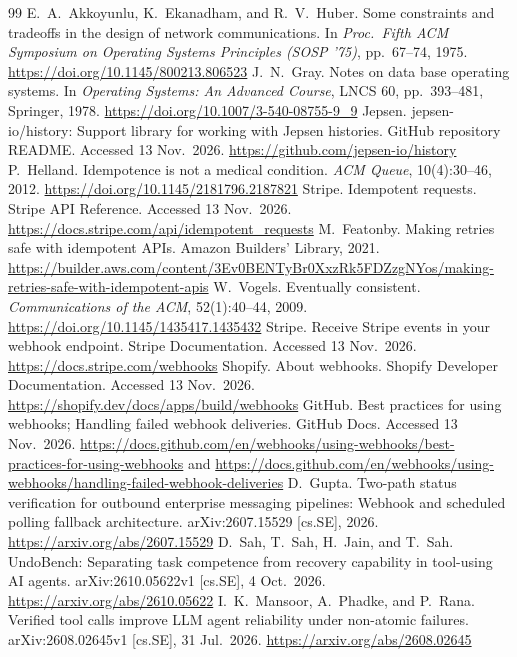 \documentclass[11pt]{article}
\begin{document}
\begin{thebibliography}{99}\footnotesize\setlength{\itemsep}{0pt}\setlength{\parsep}{0pt}
 E.~A.~Akkoyunlu, K.~Ekanadham, and R.~V.~Huber. Some constraints and tradeoffs in the design of network communications. In \emph{Proc.\ Fifth ACM Symposium on Operating Systems Principles (SOSP '75)}, pp.~67--74, 1975. \url{https://doi.org/10.1145/800213.806523}
 J.~N.~Gray. Notes on data base operating systems. In \emph{Operating Systems: An Advanced Course}, LNCS 60, pp.~393--481, Springer, 1978. \url{https://doi.org/10.1007/3-540-08755-9_9}
 Jepsen. jepsen-io/history: Support library for working with Jepsen histories. GitHub repository README. Accessed 13 Nov.\ 2026. \url{https://github.com/jepsen-io/history}
 P.~Helland. Idempotence is not a medical condition. \emph{ACM Queue}, 10(4):30--46, 2012. \url{https://doi.org/10.1145/2181796.2187821}
 Stripe. Idempotent requests. Stripe API Reference. Accessed 13 Nov.\ 2026. \url{https://docs.stripe.com/api/idempotent_requests}
 M.~Featonby. Making retries safe with idempotent APIs. Amazon Builders' Library, 2021. \url{https://builder.aws.com/content/3Ev0BENTyBr0XxzRk5FDZzgNYos/making-retries-safe-with-idempotent-apis}
 W.~Vogels. Eventually consistent. \emph{Communications of the ACM}, 52(1):40--44, 2009. \url{https://doi.org/10.1145/1435417.1435432}
 Stripe. Receive Stripe events in your webhook endpoint. Stripe Documentation. Accessed 13 Nov.\ 2026. \url{https://docs.stripe.com/webhooks}
 Shopify. About webhooks. Shopify Developer Documentation. Accessed 13 Nov.\ 2026. \url{https://shopify.dev/docs/apps/build/webhooks}
 GitHub. Best practices for using webhooks; Handling failed webhook deliveries. GitHub Docs. Accessed 13 Nov.\ 2026. \url{https://docs.github.com/en/webhooks/using-webhooks/best-practices-for-using-webhooks} and \url{https://docs.github.com/en/webhooks/using-webhooks/handling-failed-webhook-deliveries}
 D.~Gupta. Two-path status verification for outbound enterprise messaging pipelines: Webhook and scheduled polling fallback architecture. arXiv:2607.15529 [cs.SE], 2026. \url{https://arxiv.org/abs/2607.15529}
 D.~Sah, T.~Sah, H.~Jain, and T.~Sah. UndoBench: Separating task competence from recovery capability in tool-using AI agents. arXiv:2610.05622v1 [cs.SE], 4 Oct.\ 2026. \url{https://arxiv.org/abs/2610.05622}
 I.~K.~Mansoor, A.~Phadke, and P.~Rana. Verified tool calls improve LLM agent reliability under non-atomic failures. arXiv:2608.02645v1 [cs.SE], 31 Jul.\ 2026. \url{https://arxiv.org/abs/2608.02645}

\end{thebibliography}
\end{document}

